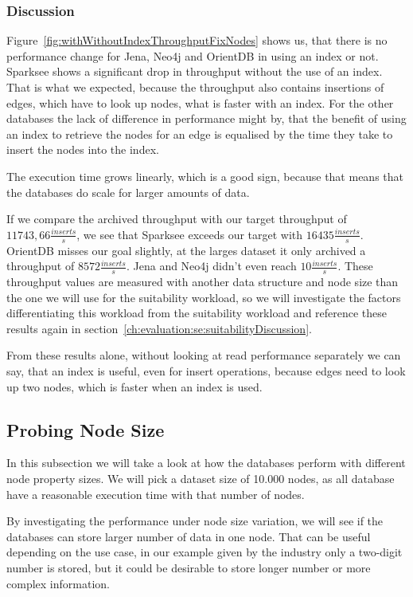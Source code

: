 \subsubsection{Discussion}
Figure~\ref{fig:withWithoutIndexThroughputFixNodes} shows us,
that there is no performance change for Jena, Neo4j and OrientDB in using an index or not.
Sparksee shows a significant drop in throughput without the use of an index.
That is what we expected,
because the throughput also contains insertions of edges,
which have to look up nodes,
what is faster with an index.
For the other databases the lack of difference in performance might by,
that the benefit of using an index to retrieve the nodes for an edge is equalised by the time they take to insert the nodes into the index.

The execution time grows linearly,
which is a good sign,
because that means that the databases do scale for larger amounts of data.

If we compare the archived throughput with our target throughput of $ 11743,66 \frac{inserts}{s} $,
we see that Sparksee exceeds our target with $ 16435 \frac{inserts}{s} $.
OrientDB misses our goal slightly,
at the larges dataset it only archived a throughput of $ 8572 \frac{inserts}{s} $.
Jena and Neo4j didn't even reach $ 10 \frac{inserts}{s} $.
These throughput values are measured with another data structure and node size than the one we will use for the suitability workload,
so we will investigate the factors differentiating this workload from the suitability workload and reference these results again in section~\ref{ch:evaluation:se:suitabilityDiscussion}.

From these results alone,
without looking at read performance separately we can say,
that an index is useful,
even for insert operations,
because edges need to look up two nodes,
which is faster when an index is used.

\subsection{Probing Node Size}
\label{ch:evaluation:se:probingNodeSize}
In this subsection we will take a look at how the databases perform with different node property sizes.
We will pick a dataset size of 10.000 nodes,
as all database have a reasonable execution time with that number of nodes.

By investigating the performance under node size variation,
we will see if the databases can store larger number of data in one node.
That can be useful depending on the use case,
in our example given by the industry only a two-digit number is stored,
but it could be desirable to store longer number or more complex information.

